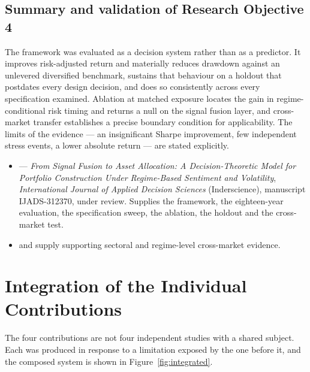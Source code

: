 \subsection{Summary and validation of Research Objective 4}

The framework was evaluated as a decision system rather than as a predictor. It improves
risk-adjusted return and materially reduces drawdown against an unlevered diversified
benchmark, sustains that behaviour on a holdout that postdates every design decision, and
does so consistently across every specification examined. Ablation at matched exposure
locates the gain in regime-conditional risk timing and returns a null on the signal fusion
layer, and cross-market transfer establishes a precise boundary condition for
applicability. The limits of the evidence --- an insignificant Sharpe improvement, few
independent stress events, a lower absolute return --- are stated explicitly.

\begin{itemize}
\item {} --- \emph{From Signal Fusion to Asset Allocation: A Decision-Theoretic
Model for Portfolio Construction Under Regime-Based Sentiment and Volatility},
\emph{International Journal of Applied Decision Sciences} (Inderscience), manuscript
IJADS-312370, under review. Supplies the framework, the eighteen-year
evaluation, the specification sweep, the ablation, the holdout and the cross-market test.
\item {} and  supply supporting sectoral and regime-level
cross-market evidence.
\end{itemize}

\section{Integration of the Individual Contributions}

The four contributions are not four independent studies with a shared subject. Each was
produced in response to a limitation exposed by the one before it, and the composed system
is shown in Figure~\ref{fig:integrated}.

